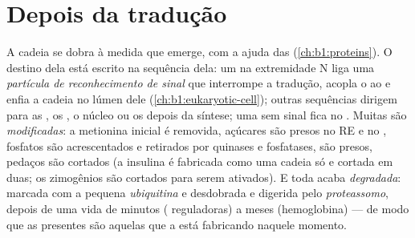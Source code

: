 \section{Depois da tradução}

\begin{proposition}\label{prop:b1:gene-expression:after}
A cadeia se dobra à medida que emerge, com a ajuda das 
(\cref{ch:b1:proteins}). O destino dela está escrito na sequência dela:
um \emph{} na extremidade N liga uma
\emph{partícula de reconhecimento de sinal} que interrompe a tradução,
acopla o  ao  e enfia a cadeia no lúmen
dele (\cref{ch:b1:eukaryotic-cell}); outras sequências dirigem 
para as , os , o núcleo ou os 
depois da síntese; uma  sem sinal fica no . Muitas
 são \emph{modificadas}: a metionina inicial é removida,
açúcares são presos no RE e no , fosfatos são acrescentados e
retirados por quinases e fosfatases,  são presos, pedaços são
cortados (a insulina é fabricada como uma cadeia só e cortada em duas;
os zimogênios são cortados para serem ativados). E toda  acaba
\emph{degradada}: marcada com a pequena  \emph{ubiquitina} e
desdobrada e digerida pelo \emph{proteassomo}, depois de uma vida de
minutos ( reguladoras) a meses (hemoglobina) --- de modo que as
 presentes são aquelas que a  está fabricando naquele
momento.
\end{proposition}

